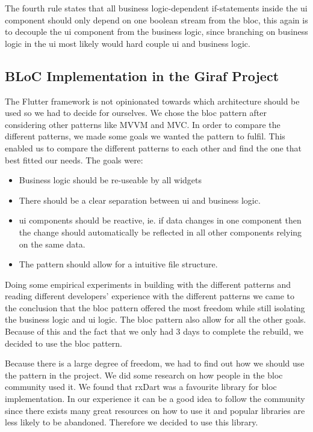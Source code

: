 The fourth rule states that all business logic-dependent if-statements inside the \gls{ui} component should only depend on one boolean stream from the \gls{bloc}, this again is to decouple the \gls{ui} component from the business logic, since branching on business logic in the \gls{ui} most likely would hard couple \gls{ui} and business logic.

\subsection{BLoC Implementation in the Giraf Project}
The Flutter framework is not opinionated towards which architecture should be used so we had to decide for ourselves. We chose the \gls{bloc} pattern after considering other patterns like MVVM and MVC. In order to compare the different patterns, we made some goals we wanted the pattern to fulfil. This enabled us to compare the different patterns to each other and find the one that best fitted our needs. The goals were:

\begin{itemize}
  \item Business logic should be re-useable by all widgets
  \item There should be a clear separation between \gls{ui} and business logic.
  \item \gls{ui} components should be reactive, ie. if data changes in one component then the change should automatically be reflected in all other components relying on the same data.
  \item The pattern should allow for a intuitive file structure.
\end{itemize}

Doing some empirical experiments in building with the different patterns and reading different developers' experience with the different patterns we came to the conclusion that the \gls{bloc} pattern offered the most freedom while still isolating the business logic and \gls{ui} logic. The \gls{bloc} pattern also allow for all the other goals. Because of this and the fact that we only had 3 days to complete the rebuild, we decided to use the \gls{bloc} pattern.

Because there is a large degree of freedom, we had to find out how we should use the pattern in the project. We did some research on how people in the \gls{bloc} community used it. We found that rxDart was a favourite library for \gls{bloc} implementation. In our experience it can be a good idea to follow the community since there exists many great resources on how to use it and popular libraries are less likely to be abandoned. Therefore we decided to use this library.

